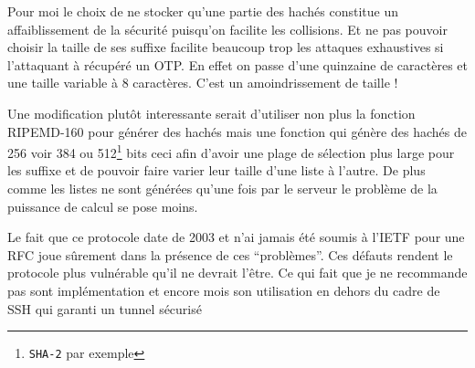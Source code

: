 \documentclass{../res/univ-projet}
\begin{document}
        Pour moi le choix de ne stocker qu'une partie des hachés constitue un affaiblissement de la sécurité puisqu'on facilite
    les collisions. Et ne pas pouvoir choisir la taille de ses suffixe facilite beaucoup trop les attaques exhaustives
    si l'attaquant à récupéré un OTP. En effet on passe d'une quinzaine de caractères et une taille variable à 8 caractères.
    C'est un amoindrissement de taille !

        Une modification plutôt interessante serait d'utiliser non plus la fonction RIPEMD-160 pour générer des hachés mais
    une fonction qui génère des hachés de 256 voir 384 ou 512\footnote{\verb?SHA-2? par exemple} bits ceci afin d'avoir une
    plage de sélection plus large pour les suffixe et de pouvoir faire varier leur taille d'une liste à l'autre.
    De plus comme les listes ne sont générées qu'une fois par le serveur le problème de la puissance de calcul se pose moins.

        Le fait que ce protocole date de 2003 et n'ai jamais été soumis à l'IETF pour une RFC joue sûrement dans la présence
    de ces ``problèmes''. Ces défauts rendent le protocole plus vulnérable qu'il ne devrait l'être. Ce qui fait que je ne recommande
    pas sont implémentation et encore mois son utilisation en dehors du cadre de SSH qui garanti un tunnel sécurisé
\end{document}
